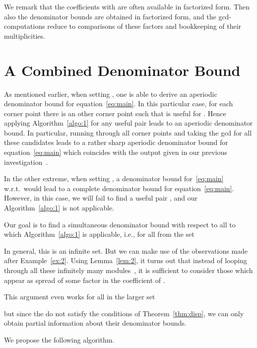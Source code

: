 \documentclass[a4paper]{sig-alternate}
\begin{document}
We remark that the coefficients  with  are often available in factorized form. Then also the denominator bounds are obtained in factorized form, and the gcd-computations reduce to comparisons of these factors and bookkeeping of their multiplicities.


\section{A Combined Denominator Bound}

As mentioned earlier, when setting , one is able to derive an aperiodic
denominator bound for equation~\eqref{eq:main}. In this particular case, for
each corner point  there is an other corner point  such that
 is useful for . Hence applying Algorithm~\ref{algo:1} for
any useful pair leads to an aperiodic denominator bound. In particular, running
through all corner points and taking the gcd for all these candidates leads to a
rather sharp aperiodic denominator bound for equation~\eqref{eq:main} which
coincides with the output given in our previous investigation~\cite{kauers10b}.

In the other extreme, when setting , a denominator bound
for~\eqref{eq:main} w.r.t.\  would lead to a complete denominator bound for
equation~\eqref{eq:main}. However, in this case, we will fail to find 
a useful pair , and our Algorithm~\ref{algo:1} is not
applicable.

Our goal is to find a simultaneous denominator bound with respect to all 
to which Algorithm~\ref{algo:1} is applicable, i.e., for all  from the set

In general, this is an infinite set. But we can make use of the observations
made after Example~\ref{ex:2}. Using Lemma~\ref{lem:2}, it turns out that instead 
of looping through all these infinitely many modules~, it is sufficient to
consider those  which appear as spread of some factor in the coefficient of
.

This argument even works for all  in the larger set

but since the  do not satisfy the conditions of Theorem~\ref{thm:disp},
we can only obtain partial information about their denominator bounds. 

We propose the following algorithm. 
\end{document}
